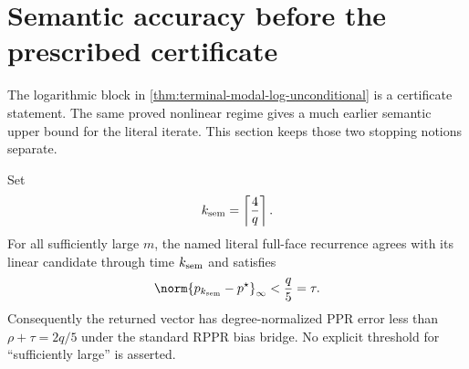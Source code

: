 \section{Semantic accuracy before the prescribed certificate}
\label{sec:terminal-modal-semantic-stop}

The logarithmic block in \cref{thm:terminal-modal-log-unconditional} is a
certificate statement.  The same proved nonlinear regime gives a much
earlier semantic upper bound for the literal iterate.  This section keeps
those two stopping notions separate.

\begin{theorem}
\label{thm:terminal-modal-semantic-stop}
Set
\begin{equation}
 k_{\rm sem}=\left\lceil\frac4q\right\rceil.
 \label{eq:terminal-modal-semantic-stop-time}
\end{equation}
For all sufficiently large $m$, the named literal full-face recurrence agrees
with its linear candidate through time $k_{\rm sem}$ and satisfies
\begin{equation}
 \norm{p_{k_{\rm sem}}-p^\star}_\infty<\frac q5=\tau.
 \label{eq:terminal-modal-semantic-stop}
\end{equation}
Consequently the returned vector has degree-normalized PPR error less than
$\rho+\tau=2q/5$ under the standard RPPR bias bridge.
No explicit threshold for ``sufficiently large'' is asserted.
\end{theorem}

